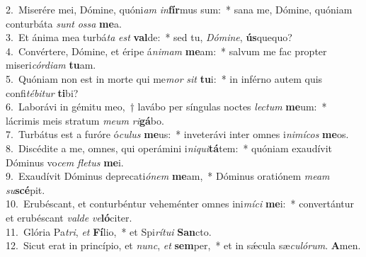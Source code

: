 {2.~}Miserére mei, Dómine, quóni\textit{am} \textit{in}\textbf{fír}mus sum:~* sana me, Dómine, quóniam conturbáta \textit{sunt} \textit{os}\textit{sa} \textbf{me}a.\\
{3.~}Et ánima mea turbá\textit{ta} \textit{est} \textbf{val}de:~* sed tu, \textit{Dó}\textit{mi}\textit{ne}, \textbf{ús}quequo?\\
{4.~}Convértere, Dómine, et éripe á\textit{ni}\textit{mam} \textbf{me}am:~* salvum me fac propter miseri\textit{cór}\textit{di}\textit{am} \textbf{tu}am.\\
{5.~}Quóniam non est in morte qui me\textit{mor} \textit{sit} \textbf{tu}i:~* in inférno autem quis confi\textit{té}\textit{bi}\textit{tur} \textbf{ti}bi?\\
{6.~}Laborávi in gémitu meo,~† lavábo per síngulas noctes \textit{le}\textit{ctum} \textbf{me}um:~* lácrimis meis stratum \textit{me}\textit{um} \textit{ri}\textbf{gá}bo.\\
{7.~}Turbátus est a furóre ó\textit{cu}\textit{lus} \textbf{me}us:~* inveterávi inter omnes i\textit{ni}\textit{mí}\textit{cos} \textbf{me}os.\\
{8.~}Discédite a me, omnes, qui operámini i\textit{ni}\textit{qui}\textbf{tá}tem:~* quóniam exaudívit Dóminus vo\textit{cem} \textit{fle}\textit{tus} \textbf{me}i.\\
{9.~}Exaudívit Dóminus deprecati\textit{ó}\textit{nem} \textbf{me}am,~* Dóminus oratiónem \textit{me}\textit{am} \textit{su}\textbf{scé}pit.\\
{10.~}Erubéscant, et conturbéntur veheménter omnes ini\textit{mí}\textit{ci} \textbf{me}i:~* convertántur et erubéscant \textit{val}\textit{de} \textit{ve}\textbf{ló}citer.\\
{11.~}Glória Pa\textit{tri}, \textit{et} \textbf{Fí}lio,~* et Spi\textit{rí}\textit{tu}\textit{i} \textbf{San}cto.\\
{12.~}Sicut erat in princípio, et \textit{nunc}, \textit{et} \textbf{sem}per,~* et in sǽcula sæ\textit{cu}\textit{ló}\textit{rum}. \textbf{A}men.\\
